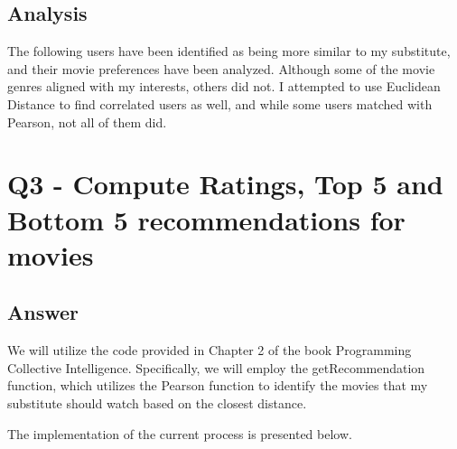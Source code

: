 \documentclass[12pt]{article}
\begin{document}
\subsection*{Analysis}

The following users have been identified as being more similar to my substitute, and their movie preferences have been analyzed. Although some of the movie genres aligned with my interests, others did not. I attempted to use Euclidean Distance to find correlated users as well, and while some users matched with Pearson, not all of them did.
\clearpage

\section*{Q3 - Compute Ratings, Top 5 and Bottom 5 recommendations for movies}

\subsection*{Answer}

We will utilize the code provided in Chapter 2 of the book Programming Collective Intelligence. Specifically, we will employ the getRecommendation function, which utilizes the Pearson function to identify the movies that my substitute should watch based on the closest distance.

The implementation of the current process is presented below.
\end{document}

